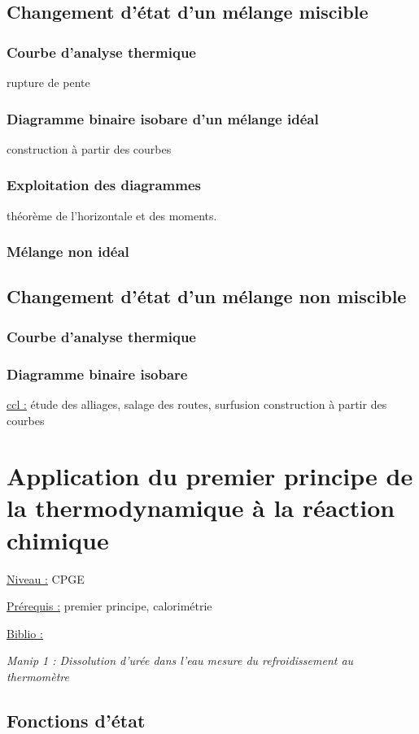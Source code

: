 \documentclass{article}%
\begin{document}
\subsection{Changement d'état d'un mélange miscible}
\subsubsection{Courbe d'analyse thermique}
rupture de pente
\subsubsection{Diagramme binaire isobare d'un mélange idéal}
construction à partir des courbes
\subsubsection{Exploitation des diagrammes}
théorème de l'horizontale et des moments.
\subsubsection{Mélange non idéal}

\subsection{Changement d'état d'un mélange non miscible}
\subsubsection{Courbe d'analyse thermique}
\subsubsection{Diagramme binaire isobare}

\underline{ccl :} étude des alliages, salage des routes, surfusion
construction à partir des courbes
\section{Application du premier principe de la thermodynamique à la réaction chimique}
\underline{Niveau :} CPGE 

\underline{Prérequis :} premier principe, calorimétrie

\underline{Biblio :} 

\textit{Manip 1 : Dissolution d'urée dans l'eau mesure du refroidissement au thermomètre}
\subsection{Fonctions d'état}
\end{document}
